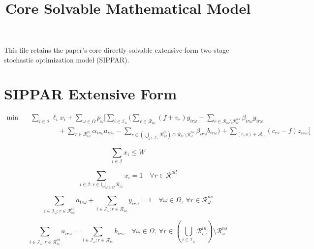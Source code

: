 \documentclass{article}
\title{Core Solvable Mathematical Model}
\author{}
\date{}
\begin{document}
\maketitle

This file retains the paper's core directly solvable extensive-form two-stage stochastic optimization model (SIPPAR).

\section{SIPPAR Extensive Form}

\begin{equation}
\begin{aligned}
\min \quad
& \sum_{i\in\mathcal{I}} \ell_i x_i
+ \sum_{\omega\in\Omega} p_\omega
\Bigg[
\sum_{i\in\mathcal{I}_\omega}
\Bigg(
\sum_{r\in\mathcal{R}_{i\omega}} (f+v_r)y_{ir\omega}
- \sum_{r\in\mathcal{R}_{i\omega}\setminus \mathcal{R}_\omega^{ns}} \beta_{ir\omega} y_{ir\omega} \\
& \qquad\qquad
+ \sum_{r\in\mathcal{R}_{i\omega}^{in}} \alpha_{ir\omega} a_{ir\omega}
- \sum_{r\in\left(\bigcup_{j\in\mathcal{I}_\omega}\mathcal{R}_{j\omega}^{in}\right)\cap\mathcal{R}_{i\omega}\setminus \mathcal{R}_\omega^{ns}} \beta_{ir\omega} b_{ir\omega}
\Bigg)
+ \sum_{(r,s)\in\mathcal{A}_\omega} (c_{rs}-f) z_{rs\omega}
\Bigg]
\end{aligned}
\tag{3}
\end{equation}

\begin{equation}
\sum_{i\in\mathcal{I}} x_i \le W
\tag{4}
\end{equation}

\begin{equation}
\sum_{i\in\mathcal{I}: r\in \bigcup_{\omega\in\Omega}\mathcal{R}_{i\omega}} x_i = 1
\quad \forall r\in\mathcal{R}^{all}
\tag{5}
\end{equation}

\begin{equation}
\sum_{i\in\mathcal{I}_\omega: r\in\mathcal{R}_{i\omega}^{in}} a_{ir\omega}
+ \sum_{i\in\mathcal{I}_\omega: r\in\mathcal{R}_{i\omega}} y_{ir\omega} = 1
\quad \forall \omega\in\Omega,\ \forall r\in\mathcal{R}_\omega^{ns}
\tag{6}
\end{equation}

\begin{equation}
\sum_{i\in\mathcal{I}_\omega: r\in\mathcal{R}_{i\omega}^{in}} a_{ir\omega}
=
\sum_{i\in\mathcal{I}_\omega: r\in\mathcal{R}_{i\omega}} b_{ir\omega}
\quad
\forall \omega\in\Omega,\ \forall r\in
\left(\bigcup_{i\in\mathcal{I}_\omega}\mathcal{R}_{i\omega}^{in}\right)\setminus \mathcal{R}_\omega^{ns}
\tag{7}
\end{equation}
\end{document}
